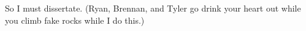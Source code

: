 
So I must dissertate. (Ryan, Brennan, and Tyler go drink your heart out while you climb fake rocks while I do this.) 


